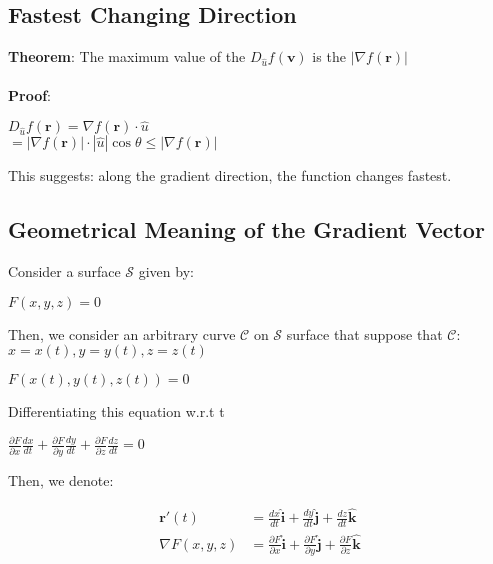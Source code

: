 \documentclass[UTF8,a4paper, 10pt, openany]{svmono}
\begin{document}
\subsection{Fastest Changing Direction}
\textbf{Theorem}: The maximum value of the $D_{\hat{u}}f(\mathbf{v})$ is the $|\nabla f(\mathbf{r})|$\\ \\

\textbf{Proof}:

\begin{center}
$D_{\hat{u}}f(\mathbf{r})=\nabla f(\mathbf{r})\cdot \hat{u}$\\
$= |\nabla f(\mathbf{r})|\cdot |\hat{u}|\cos \theta \leq |\nabla f(\mathbf{r})|$
\end{center}

This suggests: along the gradient direction, the function changes fastest.

\subsection{Geometrical Meaning of the Gradient Vector}
Consider a surface $\mathcal{S}$ given by:

\begin{center}
$F(x,y,z)=0$
\end{center}

Then, we consider an arbitrary curve $\mathcal{C}$ on $\mathcal{S}$ surface that suppose that $\mathcal{C}$: $x=x(t),y=y(t),z=z(t)$

\begin{center}
$F(x(t),y(t),z(t))=0$
\end{center}

Differentiating this equation w.r.t t

\begin{center}
$\frac{\partial F}{\partial x}\frac{dx}{dt}+\frac{\partial F}{\partial y}\frac{dy}{dt}+\frac{\partial F}{\partial z}\frac{dz}{dt}=0$
\end{center}

Then, we denote:

\begin{align*}
\mathbf{r}'(t)&=\frac{dx}{dt}\mathbf{\hat{i}}+\frac{dy}{dt}\mathbf{\hat{j}}+\frac{dz}{dt}\mathbf{\hat{k}}\\
\nabla F(x,y,z)&=\frac{\partial F}{\partial x}\mathbf{\hat{i}}+\frac{\partial F}{\partial y}\mathbf{\hat{j}}+\frac{\partial F}{\partial z}\mathbf{\hat{k}}\\
\end{align*}
\end{document}
